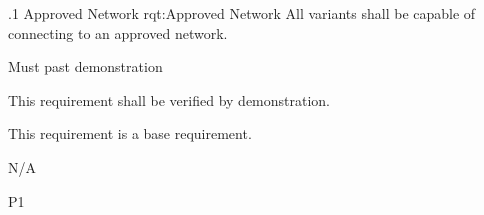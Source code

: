 \ONERQMTVKPP
{\RqtNumberBase.1}
{Approved Network}
{rqt:Approved Network}
{All \ThisSys variants shall be capable of connecting to an approved network.}
{
	\item [Phase 1] Must past demonstration
}
{This requirement shall be verified by demonstration.}
{
	\item [N/A] This requirement is a base requirement.
}
{
  \item N/A
}
{P1}


